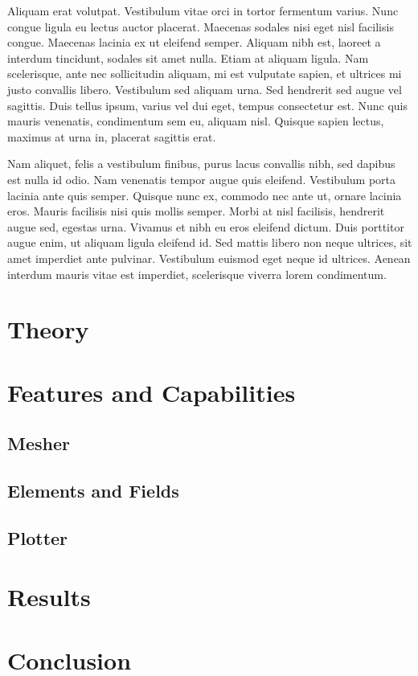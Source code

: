 \documentclass[headings=standardclasses, abstract=true]{scrartcl}
\begin{document}
Aliquam erat volutpat. Vestibulum vitae orci in tortor fermentum varius. Nunc congue ligula eu lectus auctor placerat. Maecenas sodales nisi eget nisl facilisis congue. Maecenas lacinia ex ut eleifend semper. Aliquam nibh est, laoreet a interdum tincidunt, sodales sit amet nulla. Etiam at aliquam ligula. Nam scelerisque, ante nec sollicitudin aliquam, mi est vulputate sapien, et ultrices mi justo convallis libero. Vestibulum sed aliquam urna. Sed hendrerit sed augue vel sagittis. Duis tellus ipsum, varius vel dui eget, tempus consectetur est. Nunc quis mauris venenatis, condimentum sem eu, aliquam nisl. Quisque sapien lectus, maximus at urna in, placerat sagittis erat.

Nam aliquet, felis a vestibulum finibus, purus lacus convallis nibh, sed dapibus est nulla id odio. Nam venenatis tempor augue quis eleifend. Vestibulum porta lacinia ante quis semper. Quisque nunc ex, commodo nec ante ut, ornare lacinia eros. Mauris facilisis nisi quis mollis semper. Morbi at nisl facilisis, hendrerit augue sed, egestas urna. Vivamus et nibh eu eros eleifend dictum. Duis porttitor augue enim, ut aliquam ligula eleifend id. Sed mattis libero non neque ultrices, sit amet imperdiet ante pulvinar. Vestibulum euismod eget neque id ultrices. Aenean interdum mauris vitae est imperdiet, scelerisque viverra lorem condimentum.

\section{Theory}

\section{Features and Capabilities}

\subsection{Mesher}

\subsection{Elements and Fields}

\subsection{Plotter}

\section{Results}

\section{Conclusion}

\printbibliography
\end{document}
